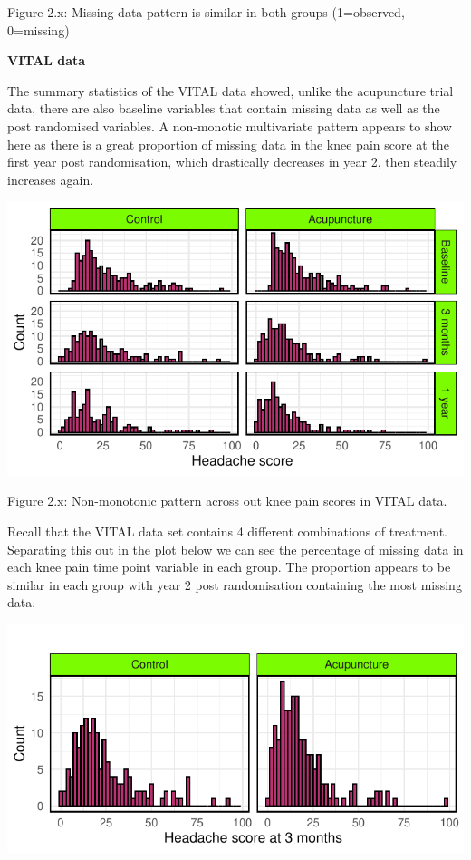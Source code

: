 \documentclass{article}
\begin{document}
Figure 2.x: Missing data pattern is similar in both groups (1=observed,
0=missing)

\textbf{VITAL data}

The summary statistics of the VITAL data showed, unlike the acupuncture
trial data, there are also baseline variables that contain missing data
as well as the post randomised variables. A non-monotic multivariate
pattern appears to show here as there is a great proportion of missing
data in the knee pain score at the first year post randomisation, which
drastically decreases in year 2, then steadily increases again.

\includegraphics{Final_Report_files/figure-latex/unnamed-chunk-11-1.pdf}

Figure 2.x: Non-monotonic pattern across out knee pain scores in VITAL
data.

Recall that the VITAL data set contains 4 different combinations of
treatment. Separating this out in the plot below we can see the
percentage of missing data in each knee pain time point variable in each
group. The proportion appears to be similar in each group with year 2
post randomisation containing the most missing data.

\includegraphics{Final_Report_files/figure-latex/unnamed-chunk-12-1.pdf}
\end{document}
